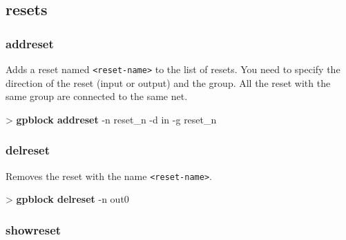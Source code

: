 \documentclass[10pt,a4paper]{article}
\begin{document}
\subsection{resets}
\subsubsection{addreset}
\label{subsec:addreset}

Adds a reset named \texttt{<reset-name>} to the list of resets. You need to specify the direction of the reset (input or output) and the group. All the reset with the same group are connected to the same net.\\


\begin{sampletitle}
> \textbf{gpblock addreset} -n reset\_n -d in -g reset\_n
\end{sampletitle}


\subsubsection{delreset}
\label{subsec:delreset}

Removes the reset with the name \texttt{<reset-name>}.\\


\begin{sampletitle}
> \textbf{gpblock delreset} -n out0
\end{sampletitle}


\subsubsection{showreset}
\label{subsec:showreset}
\end{document}
